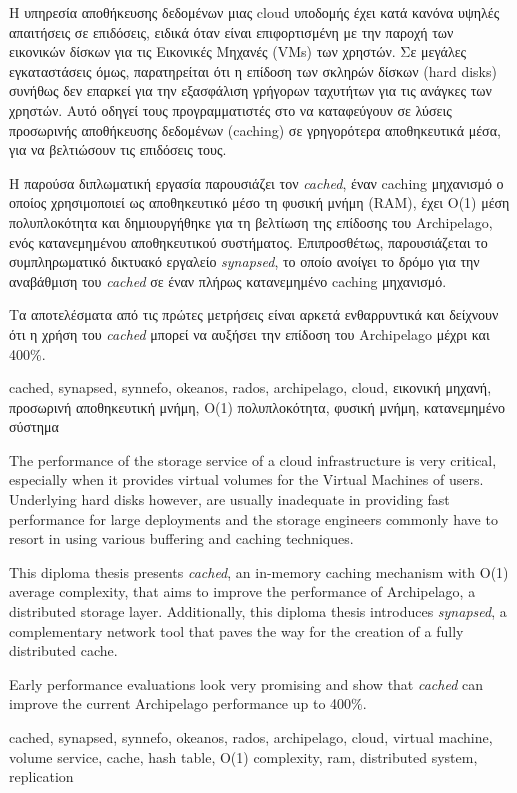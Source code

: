 \begin{abstractgr}
	Η υπηρεσία αποθήκευσης δεδομένων μιας cloud υποδομής έχει κατά κανόνα 
	υψηλές απαιτήσεις σε επιδόσεις, ειδικά όταν είναι επιφορτισμένη με την 
	παροχή των εικονικών δίσκων για τις Εικονικές Μηχανές (VMs) των χρηστών. Σε 
	μεγάλες εγκαταστάσεις όμως, παρατηρείται ότι η επίδοση των σκληρών δίσκων 
	(hard disks) συνήθως δεν επαρκεί για την εξασφάλιση γρήγορων ταχυτήτων για 
	τις ανάγκες των χρηστών. Αυτό οδηγεί τους προγραμματιστές στο να 
	καταφεύγουν σε λύσεις προσωρινής αποθήκευσης δεδομένων (caching) σε 
	γρηγορότερα αποθηκευτικά μέσα, για να βελτιώσουν τις επιδόσεις τους.
	
	Η παρούσα διπλωματική εργασία παρουσιάζει τον \textit{cached}, έναν caching 
	μηχανισμό ο οποίος χρησιμοποιεί ως αποθηκευτικό μέσο τη φυσική μνήμη (RAM), 
	έχει Ο(1) μέση πολυπλοκότητα και δημιουργήθηκε για τη βελτίωση της επίδοσης 
	του Archipelago, ενός κατανεμημένου αποθηκευτικού συστήματος.	
	Επιπροσθέτως, παρουσιάζεται το συμπληρωματικό δικτυακό εργαλείο 
	\textit{synapsed}, το οποίο ανοίγει το δρόμο για την αναβάθμιση του 
	\textit{cached} σε έναν πλήρως κατανεμημένο caching μηχανισμό.
	
	Τα αποτελέσματα από τις πρώτες μετρήσεις είναι αρκετά ενθαρρυντικά και 
	δείχνουν ότι η χρήση του \textit{cached} μπορεί να αυξήσει την επίδοση του 
	Archipelago μέχρι και 400\%.
	\begin{keywordsgr}
		cached, synapsed, synnefo, okeanos, rados, archipelago, cloud, εικονική 
		μηχανή, προσωρινή αποθηκευτική μνήμη, Ο(1) πολυπλοκότητα, φυσική μνήμη, 
		κατανεμημένο σύστημα
		\end{keywordsgr}
\end{abstractgr}

\begin{abstracten}
	The performance of the storage service of a cloud infrastructure is very 
	critical, especially when it provides virtual volumes for the Virtual
	Machines of users. Underlying hard disks however, are usually inadequate in 
	providing fast performance for large deployments and the storage engineers 
	commonly have to resort in using various buffering and caching techniques.
	
	This diploma thesis presents \textit{cached}, an in-memory caching 
	mechanism with O(1) average complexity, that aims to improve the 
	performance of Archipelago, a distributed storage layer. Additionally, this 
	diploma thesis introduces \textit{synapsed}, a complementary network tool 
	that paves the way for the creation of a fully distributed cache.
	
	Early performance evaluations look very promising and show that 
	\textit{cached} can improve the current Archipelago performance up to 
	400\%.
	\begin{keywordsen}
		cached, synapsed, synnefo, okeanos, rados, archipelago, cloud, virtual 
		machine, volume service, cache, hash table,  Ο(1) complexity, ram, 
		distributed system, replication
	\end{keywordsen}
\end{abstracten}

\begin{acknowledgementsgr}
	\todo
\end{acknowledgementsgr}
